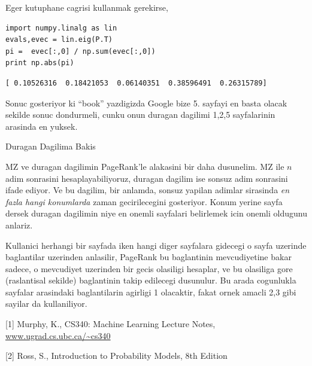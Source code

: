 \documentclass[12pt,fleqn]{article}\usepackage{../common}
\begin{document}
Eger kutuphane cagrisi kullanmak gerekirse, 

\begin{verbatim}
import numpy.linalg as lin
evals,evec = lin.eig(P.T)
pi =  evec[:,0] / np.sum(evec[:,0])
print np.abs(pi)
\end{verbatim}

\begin{verbatim}
[ 0.10526316  0.18421053  0.06140351  0.38596491  0.26315789]
\end{verbatim}

Sonuc gosteriyor ki ``book'' yazdigizda Google bize 5. sayfayi en basta
olacak sekilde sonuc dondurmeli, cunku onun duragan dagilimi 1,2,5
sayfalarinin arasinda en yuksek.

Duragan Dagilima Bakis

MZ ve duragan dagilimin PageRank'le alakasini bir daha dusunelim. MZ ile
$n$ adim sonrasini hesaplayabiliyoruz, duragan dagilim ise sonsuz adim
sonrasini ifade ediyor. Ve bu dagilim, bir anlamda, sonsuz yapilan adimlar
sirasinda {\em en fazla hangi konumlarda} zaman gecirilecegini
gosteriyor. Konum yerine sayfa dersek duragan dagilimin niye en onemli
sayfalari belirlemek icin onemli oldugunu anlariz. 

Kullanici herhangi bir sayfada iken hangi diger sayfalara gidecegi o sayfa
uzerinde baglantilar uzerinden anlasilir, PageRank bu baglantinin
mevcudiyetine bakar sadece, o mevcudiyet uzerinden bir gecis olasiligi
hesaplar, ve bu olasiliga gore (raslantisal sekilde) baglantinin takip
edilecegi dusunulur. Bu arada cogunlukla sayfalar arasindaki baglantilarin
agirligi 1 olacaktir, fakat ornek amacli 2,3 gibi sayilar da kullaniliyor. 


[1] Murphy, K., CS340: Machine Learning Lecture Notes, \url{www.ugrad.cs.ubc.ca/~cs340}

[2] Ross, S., Introduction to Probability Models, 8th Edition
\end{document}

